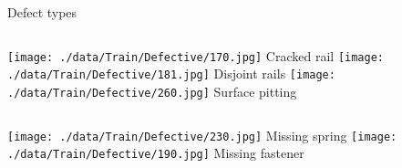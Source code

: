 \documentclass[aspectratio=169]{beamer}
\begin{document}
\begin{frame}{Defect types}
    \begin{columns}[b]
        \centering
        \texttt{[image: ./data/Train/Defective/170.jpg]}
        Cracked rail
        \centering
        \texttt{[image: ./data/Train/Defective/181.jpg]}
        Disjoint rails
        \centering
        \texttt{[image: ./data/Train/Defective/260.jpg]}
        Surface pitting
    \end{columns}
    \begin{columns}[c]
        \centering
        \texttt{[image: ./data/Train/Defective/230.jpg]}
        Missing spring
        \centering
        \texttt{[image: ./data/Train/Defective/190.jpg]}
        Missing fastener
    \end{columns}
\end{frame}
\end{document}
